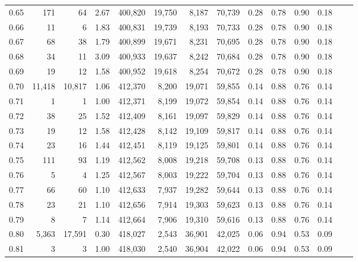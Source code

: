 \begin{tabular}{rrrrrrrrrrrrrr}
0.65 &     171 &      64 &      2.67 &  400,820 &   19,750 &   8,187 &  70,739 &  0.28 &  0.78 &  0.90 &      0.18 \\
0.66 &      11 &       6 &      1.83 &  400,831 &   19,739 &   8,193 &  70,733 &  0.28 &  0.78 &  0.90 &      0.18 \\
0.67 &      68 &      38 &      1.79 &  400,899 &   19,671 &   8,231 &  70,695 &  0.28 &  0.78 &  0.90 &      0.18 \\
0.68 &      34 &      11 &      3.09 &  400,933 &   19,637 &   8,242 &  70,684 &  0.28 &  0.78 &  0.90 &      0.18 \\
0.69 &      19 &      12 &      1.58 &  400,952 &   19,618 &   8,254 &  70,672 &  0.28 &  0.78 &  0.90 &      0.18 \\
0.70 &  11,418 &  10,817 &      1.06 &  412,370 &    8,200 &  19,071 &  59,855 &  0.14 &  0.88 &  0.76 &      0.14 \\
0.71 &       1 &       1 &      1.00 &  412,371 &    8,199 &  19,072 &  59,854 &  0.14 &  0.88 &  0.76 &      0.14 \\
0.72 &      38 &      25 &      1.52 &  412,409 &    8,161 &  19,097 &  59,829 &  0.14 &  0.88 &  0.76 &      0.14 \\
0.73 &      19 &      12 &      1.58 &  412,428 &    8,142 &  19,109 &  59,817 &  0.14 &  0.88 &  0.76 &      0.14 \\
0.74 &      23 &      16 &      1.44 &  412,451 &    8,119 &  19,125 &  59,801 &  0.14 &  0.88 &  0.76 &      0.14 \\
0.75 &     111 &      93 &      1.19 &  412,562 &    8,008 &  19,218 &  59,708 &  0.13 &  0.88 &  0.76 &      0.14 \\
0.76 &       5 &       4 &      1.25 &  412,567 &    8,003 &  19,222 &  59,704 &  0.13 &  0.88 &  0.76 &      0.14 \\
0.77 &      66 &      60 &      1.10 &  412,633 &    7,937 &  19,282 &  59,644 &  0.13 &  0.88 &  0.76 &      0.14 \\
0.78 &      23 &      21 &      1.10 &  412,656 &    7,914 &  19,303 &  59,623 &  0.13 &  0.88 &  0.76 &      0.14 \\
0.79 &       8 &       7 &      1.14 &  412,664 &    7,906 &  19,310 &  59,616 &  0.13 &  0.88 &  0.76 &      0.14 \\
0.80 &   5,363 &  17,591 &      0.30 &  418,027 &    2,543 &  36,901 &  42,025 &  0.06 &  0.94 &  0.53 &      0.09 \\
0.81 &       3 &       3 &      1.00 &  418,030 &    2,540 &  36,904 &  42,022 &  0.06 &  0.94 &  0.53 &      0.09 \\

\end{tabular}
